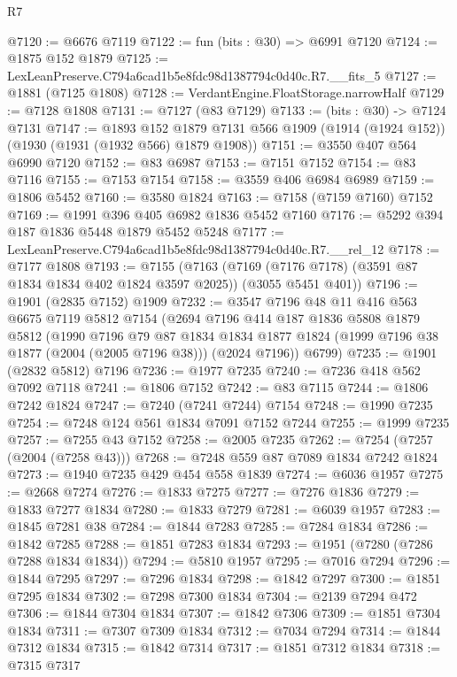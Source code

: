 \begin{lexlean}{R7}
\begin{coremodule}
@7120 := @6676 @7119
@7122 := fun (bits : @30) => @6991 @7120
@7124 := @1875 @152 @1879
@7125 := LexLeanPreserve.C794a6cad1b5e8fdc98d1387794c0d40c.R7.__fits_5
@7127 := @1881 (@7125 @1808)
@7128 := VerdantEngine.FloatStorage.narrowHalf
@7129 := @7128 @1808
@7131 := @7127 (@83 @7129)
@7133 := (bits : @30) -> @7124 @7131
@7147 := @1893
    @152
    @1879
    @7131
    @566
    @1909
    (@1914 (@1924 @152))
    (@1930 (@1931 (@1932 @566) @1879 @1908))
@7151 := @3550 @407 @564 @6990 @7120
@7152 := @83 @6987
@7153 := @7151 @7152
@7154 := @83 @7116
@7155 := @7153 @7154
@7158 := @3559 @406 @6984 @6989
@7159 := @1806 @5452
@7160 := @3580 @1824
@7163 := @7158 (@7159 @7160) @7152
@7169 := @1991 @396 @405 @6982 @1836 @5452 @7160
@7176 := @5292 @394 @187 @1836 @5448 @1879 @5452 @5248
@7177 := LexLeanPreserve.C794a6cad1b5e8fdc98d1387794c0d40c.R7.__rel_12
@7178 := @7177 @1808
@7193 := @7155
    (@7163 (@7169 (@7176 @7178) (@3591 @87 @1834 @1834 @402 @1824 @3597 @2025)) (@3055 @5451 @401))
@7196 := @1901 (@2835 @7152) @1909
@7232 := @3547
    @7196
    @48
    @11
    @416
    @563
    @6675
    @7119
    @5812
    @7154
    (@2694
      @7196
      @414
      @187
      @1836
      @5808
      @1879
      @5812
      (@1990
        @7196
        @79
        @87
        @1834
        @1834
        @1877
        @1824
        (@1999 @7196 @38 @1877 (@2004 (@2005 @7196 @38)))
        (@2024 @7196))
      @6799)
@7235 := @1901 (@2832 @5812) @7196
@7236 := @1977 @7235
@7240 := @7236 @418 @562 @7092 @7118
@7241 := @1806 @7152
@7242 := @83 @7115
@7244 := @1806 @7242 @1824
@7247 := @7240 (@7241 @7244) @7154
@7248 := @1990 @7235
@7254 := @7248 @124 @561 @1834 @7091 @7152 @7244
@7255 := @1999 @7235
@7257 := @7255 @43 @7152
@7258 := @2005 @7235
@7262 := @7254 (@7257 (@2004 (@7258 @43)))
@7268 := @7248 @559 @87 @7089 @1834 @7242 @1824
@7273 := @1940 @7235 @429 @454 @558 @1839
@7274 := @6036 @1957
@7275 := @2668 @7274
@7276 := @1833 @7275
@7277 := @7276 @1836
@7279 := @1833 @7277 @1834
@7280 := @1833 @7279
@7281 := @6039 @1957
@7283 := @1845 @7281 @38
@7284 := @1844 @7283
@7285 := @7284 @1834
@7286 := @1842 @7285
@7288 := @1851 @7283 @1834
@7293 := @1951 (@7280 (@7286 @7288 @1834 @1834))
@7294 := @5810 @1957
@7295 := @7016 @7294
@7296 := @1844 @7295
@7297 := @7296 @1834
@7298 := @1842 @7297
@7300 := @1851 @7295 @1834
@7302 := @7298 @7300 @1834
@7304 := @2139 @7294 @472
@7306 := @1844 @7304 @1834
@7307 := @1842 @7306
@7309 := @1851 @7304 @1834
@7311 := @7307 @7309 @1834
@7312 := @7034 @7294
@7314 := @1844 @7312 @1834
@7315 := @1842 @7314
@7317 := @1851 @7312 @1834
@7318 := @7315 @7317

\end{coremodule}
\end{lexlean}
